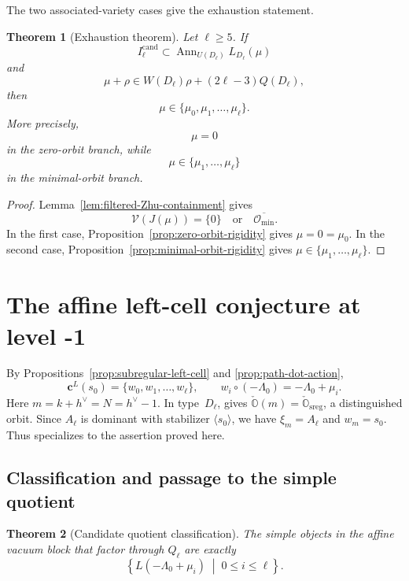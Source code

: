 \documentclass[11pt]{amsart}
\newtheorem{theorem}{Theorem}[section]
\theoremstyle{remark}
\numberwithin{equation}{section}
\begin{document}
The two associated-variety cases give the exhaustion statement.

\begin{theorem}[Exhaustion theorem]
\label{thm:exhaustion}
Let \(\ell\ge5\).  If
\[
   I_\ell^{\mathrm{cand}}
   \subset
   \operatorname{Ann}_{U(D_\ell)}L_{D_\ell}(\mu)
\]
and
\[
   \mu+\rho
   \in
   W(D_\ell)\rho
   +(2\ell-3)Q(D_\ell),
\]
then
\begin{equation}
   \mu\in\{\mu_0,\mu_1,\ldots,\mu_\ell\}.
\end{equation}
More precisely,
\[
   \mu=0
\]
in the zero-orbit branch, while
\[
   \mu\in\{\mu_1,\ldots,\mu_\ell\}
\]
in the minimal-orbit branch.
\end{theorem}

\begin{proof}
Lemma~\ref{lem:filtered-Zhu-containment} gives
\[
   \mathcal V(J(\mu))
   =
   \{0\}
   \quad\text{or}\quad
   \overline{\mathcal O_{\min}}.
\]
In the first case,
Proposition~\ref{prop:zero-orbit-rigidity} gives \(\mu=0=\mu_0\).
In the second case,
Proposition~\ref{prop:minimal-orbit-rigidity} gives
\(\mu\in\{\mu_1,\ldots,\mu_\ell\}\).
\end{proof}

\section{The affine left-cell conjecture at level -1}
\label{sec:final-left-cell}

By Propositions~\ref{prop:subregular-left-cell} and
\ref{prop:path-dot-action},
\[
   \mathbf c^L(s_0)=\{w_0,w_1,\ldots,w_\ell\},
   \qquad
   w_i\circ(-\Lambda_0)=-\Lambda_0+\mu_i.
\]
Here \(m=k+h^\vee=N=h^\vee-1\).  In type~\(D_\ell\),
\cite[Section~2.4.7]{ShanYanZhao2025} gives
\(\check{\mathbb O}(m)=\check{\mathbb O}_{\mathrm{sreg}}\), a distinguished
orbit.  Since \(A_\ell\) is dominant with stabilizer \(\langle s_0\rangle\),
we have \(\xi_m=A_\ell\) and \(w_m=s_0\).  Thus
\cite[Conjecture~5.2.1]{ShanYanZhao2026} specializes to the assertion proved here.

\subsection{Classification and passage to the simple quotient}

\begin{theorem}[Candidate quotient classification]
\label{thm:classification-Q}
The simple objects in the affine vacuum block that factor through \(Q_\ell\)
are exactly
\begin{equation}
   \left\{
      L(-\Lambda_0+\mu_i)\;\middle|\;0\le i\le\ell
   \right\}.
\end{equation}
\end{theorem}
\end{document}
